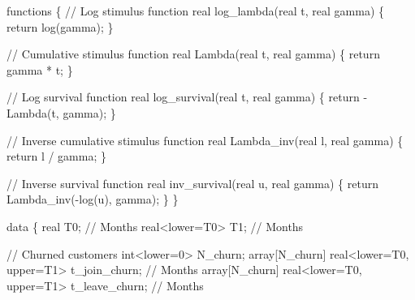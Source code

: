 \documentclass[
  letterpaper,
  DIV=11,
  numbers=noendperiod]{scrartcl}
\newenvironment{Shaded}{\begin{snugshade}}{\end{snugshade}}
\newcommand{\CommentTok}[1]{\textcolor[rgb]{0.37,0.37,0.37}{#1}}
\newcommand{\ControlFlowTok}[1]{\textcolor[rgb]{0.00,0.23,0.31}{#1}}
\newcommand{\DataTypeTok}[1]{\textcolor[rgb]{0.68,0.00,0.00}{#1}}
\newcommand{\DecValTok}[1]{\textcolor[rgb]{0.68,0.00,0.00}{#1}}
\newcommand{\KeywordTok}[1]{\textcolor[rgb]{0.00,0.23,0.31}{#1}}
\newcommand{\NormalTok}[1]{\textcolor[rgb]{0.00,0.23,0.31}{#1}}
\begin{document}
\begin{codelisting}

\caption{\texttt{model2.stan}}

\begin{Shaded}
\begin{Highlighting}[]
\KeywordTok{functions}\NormalTok{ \{}
  \CommentTok{// Log stimulus function}
  \DataTypeTok{real}\NormalTok{ log\_lambda(}\DataTypeTok{real}\NormalTok{ t, }\DataTypeTok{real}\NormalTok{ gamma) \{}
    \ControlFlowTok{return}\NormalTok{ log(gamma);}
\NormalTok{  \}}
  
  \CommentTok{// Cumulative stimulus function}
  \DataTypeTok{real}\NormalTok{ Lambda(}\DataTypeTok{real}\NormalTok{ t, }\DataTypeTok{real}\NormalTok{ gamma) \{}
    \ControlFlowTok{return}\NormalTok{ gamma * t;}
\NormalTok{  \}}

  \CommentTok{// Log survival function}
  \DataTypeTok{real}\NormalTok{ log\_survival(}\DataTypeTok{real}\NormalTok{ t, }\DataTypeTok{real}\NormalTok{ gamma) \{}
    \ControlFlowTok{return}\NormalTok{ {-}Lambda(t, gamma);}
\NormalTok{  \}}

  \CommentTok{// Inverse cumulative stimulus function}
  \DataTypeTok{real}\NormalTok{ Lambda\_inv(}\DataTypeTok{real}\NormalTok{ l, }\DataTypeTok{real}\NormalTok{ gamma) \{}
    \ControlFlowTok{return}\NormalTok{ l / gamma;}
\NormalTok{  \}}
  
  \CommentTok{// Inverse survival function}
  \DataTypeTok{real}\NormalTok{ inv\_survival(}\DataTypeTok{real}\NormalTok{ u, }\DataTypeTok{real}\NormalTok{ gamma) \{}
    \ControlFlowTok{return}\NormalTok{ Lambda\_inv({-}log(u), gamma);}
\NormalTok{  \}}
\NormalTok{\}}

\KeywordTok{data}\NormalTok{ \{}
  \DataTypeTok{real}\NormalTok{           T0; }\CommentTok{// Months}
  \DataTypeTok{real}\NormalTok{\textless{}}\KeywordTok{lower}\NormalTok{=T0\textgreater{} T1; }\CommentTok{// Months}

  \CommentTok{// Churned customers}
  \DataTypeTok{int}\NormalTok{\textless{}}\KeywordTok{lower}\NormalTok{=}\DecValTok{0}\NormalTok{\textgreater{} N\_churn;}
  \DataTypeTok{array}\NormalTok{[N\_churn] }\DataTypeTok{real}\NormalTok{\textless{}}\KeywordTok{lower}\NormalTok{=T0, }\KeywordTok{upper}\NormalTok{=T1\textgreater{} t\_join\_churn;  }\CommentTok{// Months}
  \DataTypeTok{array}\NormalTok{[N\_churn] }\DataTypeTok{real}\NormalTok{\textless{}}\KeywordTok{lower}\NormalTok{=T0, }\KeywordTok{upper}\NormalTok{=T1\textgreater{} t\_leave\_churn; }\CommentTok{// Months}


\end{Highlighting}
\end{Shaded}
\end{codelisting}
\end{document}
